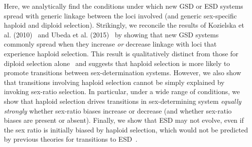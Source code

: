 \documentclass[10pt,letterpaper]{article}
\begin{document}
Here, we analytically find the conditions under which new GSD or ESD systems spread with generic linkage between the loci involved (and generic sex-specific haploid and diploid selection). 
Strikingly, we reconcile the results of Kozielska et al. (2010)~\cite{Kozielska:2010vm} and Ubeda et al. (2015)~\cite{Ubeda:2015fx} by showing that new GSD systems commonly spread when they increase \textit{or} decrease linkage with loci that experience haploid selection.
This result is qualitatively distinct from those for diploid selection alone~\cite{vanDoorn:2007eu,vanDoorn:2010hu} and suggests that haploid selection is more likely to promote transitions between sex-determination systems. 
However, we also show that transitions involving haploid selection cannot be simply explained by invoking sex-ratio selection. 
In particular, under a wide range of conditions, we show that haploid selection drives transitions in sex-determining system \textit{equally strongly} whether sex-ratio biases increase or decrease (and whether sex-ratio biases are present or absent). 
Finally, we show that ESD may not evolve, even if the sex ratio is initially biased by haploid selection, which would not be predicted by previous theories for transitions to ESD~\cite{Charnov:1982wg,Bull:1983vi,West:2009we}. 



\end{document}
